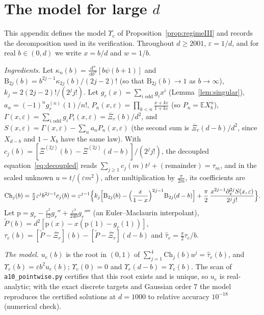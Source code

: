 \documentclass[11pt]{amsart}
\theoremstyle{definition}
\theoremstyle{remark}
\numberwithin{equation}{section}
\newcommand{\E}{\mathbb{E}}
\newcommand{\Xb}{\overline{\Xi}}
\newcommand{\dd}{\,\mathrm{d}}
\begin{document}
\appendix
\section{The model for large \texorpdfstring{$d$}{d}}\label{app:model}

This appendix defines the model $\Upsilon_e$ of Proposition~\ref{prop:regimeIII} and records the decomposition used in its
verification. Throughout $d\ge2001$, $\varepsilon=1/d$, and for real $b\in(0,d)$ we write $x=b/d$ and $w=1/b$.

\emph{Ingredients.} Let $\kappa_n(b)=\frac{\dd^n}{\dd b^n}[b\psi(b+1)]$ and $\mathrm B_{2j}(b)=b^{2j-1}\kappa_{2j}(b)/(2j-2)!$ (so that
$\mathrm B_{2j}(b)\to1$ as $b\to\infty$), $k_j=2(2j-2)!/(2^jj!)$. Let $g_r(x)=\sum_{i\text{ odd}}g_ix^i$ (Lemma~\ref{lem:singular}),
$a_n=(-1)^ng_r^{(n)}(1)/n!$, $P_n(x,\varepsilon)=\prod_{k<n}\frac{x+k\varepsilon}{1+k\varepsilon}$ (so $P_n=\E X_b^n$),
$\Gamma(x,\varepsilon)=\sum_{i\text{ odd}}g_iP_i(x,\varepsilon)=\Xb_r(b)/d^2$, and $S(x,\varepsilon)=\Gamma(x,\varepsilon)-\sum_na_nP_n(x,\varepsilon)$
(the second sum is $\Xb_r(d-b)/d^2$, since $X_{d-b}$ and $1-X_b$ have the same law). With
$c_j(b)=[\Xb^{(2j)}(b)-\Xb^{(2j)}(d-b)]/(2^jj!)$, the decoupled equation~\eqref{eq:decoupled} reads
$\sum_{j\ge1}c_j(m)t^j+(\text{remainder})=\tau_m$, and in the scaled unknown $u=t/(\varepsilon m^2)$, after multiplication by
$\frac\pi{2m}$, its coefficients are
\[
\mathrm{Ch}_j(b)=\tfrac\pi2\varepsilon^jb^{2j-1}c_j(b)=\varepsilon^{j-1}\Bigl\{k_j\Bigl[\mathrm B_{2j}(b)-\Bigl(\frac x{1-x}\Bigr)^{2j-1}\mathrm B_{2j}(d-b)\Bigr]
+\frac\pi2\,\frac{x^{2j-1}\partial_x^{2j}S(x,\varepsilon)}{2^jj!}\Bigr\}.
\]
Let $\mathrm p=g_r-\frac{\varepsilon^2}{12}g_r''+\frac{\varepsilon^4}{240}g_r''''$ (an Euler--Maclaurin interpolant), $\tilde P(b)=d^2[\mathrm p(x)-x(\mathrm p(1)-g_r(1))]$,
$\tau_e(b)=[\tilde P-\Xb_r](b)-[\tilde P-\Xb_r](d-b)$ and $\hat\tau_e=\frac\pi2\tau_e/b$.

\emph{The model.} $u_e(b)$ is the root in $(0,1)$ of $\sum_{j=1}^4\mathrm{Ch}_j(b)u^j=\hat\tau_e(b)$, and $\Upsilon_e(b)=\varepsilon b^2u_e(b)$;
$\Upsilon_e(0)=0$ and $\Upsilon_e(d-b)=\Upsilon_e(b)$. The scan of \texttt{a10\_pointwise.py} certifies that this root exists and is unique,
so $u_e$ is real-analytic; with the exact discrete targets and Gaussian order $7$ the model reproduces the certified
solutions at $d=1000$ to relative accuracy $10^{-18}$ (numerical check).
\end{document}
